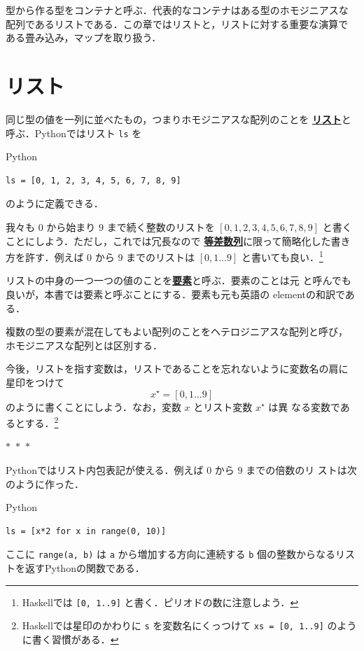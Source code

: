 \documentclass[a5paper,twoside,fleqn,draft]{jsbook}
\newcommand{\separator}{\begin{center}$*$~$*$~$*$\end{center}}
\newcommand{\programminglanguage}[1]{\textsf{#1}}
\newcommand{\haskell}{\programminglanguage{Haskell}}
\newcommand{\python}{\programminglanguage{Python}}
\newenvironment{leader}{\begingroup\gt}{\endgroup}
\newcommand{\keyword}[1]{{\underline{\textbf{#1}}}}
\newcommand{\code}[1]{\texttt{#1}}
\newenvironment{pythoncode}{\begin{itembox}[r]{\python}}{\end{itembox}}
\newcommand{\mList}[1]{{#1}^\mathrm{\star}}
\begin{document}
\begin{leader}
型から作る型をコンテナと呼ぶ．代表的なコンテナはある型のホモジニアスな
配列であるリストである．この章ではリストと，リストに対する重要な演算で
ある畳み込み，マップを取り扱う．
\end{leader}

\section{リスト}

同じ型の値を一列に並べたもの，つまりホモジニアスな配列のことを
\keyword{リスト}と呼ぶ．\python ではリスト \code{ls} を
\begin{pythoncode}
\begin{verbatim}
ls = [0, 1, 2, 3, 4, 5, 6, 7, 8, 9]
\end{verbatim}
\end{pythoncode}
のように定義できる．

我々も $0$ から始まり $9$ まで続く整数のリストを
$[0,1,2,3,4,5,6,7,8,9]$ と書くことにしよう．ただし，これでは冗長なので
\keyword{等差数列}に限って簡略化した書き方を許す．例えば $0$ から $9$
までのリストは $[0,1\dots9]$ と書いても良い．\footnote{\haskell では
  \code{[0, 1..9]} と書く．ピリオドの数に注意しよう．}

リストの中身の一つ一つの値のことを\keyword{要素}と呼ぶ．要素のことは元
と呼んでも良いが，本書では要素と呼ぶことにする．要素も元も英語の
elementの和訳である．

複数の型の要素が混在してもよい配列のことをヘテロジニアスな配列と呼び，
ホモジニアスな配列とは区別する．

今後，リストを指す変数は，リストであることを忘れないように変数名の肩に
星印をつけて
\begin{equation}
  \mList{x}
  =[0,1\dots9]
\end{equation}
のように書くことにしよう．なお，変数 $x$ とリスト変数 $\mList{x}$ は異
なる変数であるとする．\footnote{\haskell では星印のかわりに \code{s}
  を変数名にくっつけて \code{xs = [0, 1..9]} のように書く習慣がある．}

\separator

\python ではリスト内包表記が使える．例えば $0$ から $9$ までの倍数のリ
ストは次のように作った．
\begin{pythoncode}
\begin{verbatim}
ls = [x*2 for x in range(0, 10)]
\end{verbatim}
\end{pythoncode}
ここに \code{range(a, b)} は \code{a} から増加する方向に連続する
\code{b} 個の整数からなるリストを返す\python の関数である．
\end{document}

